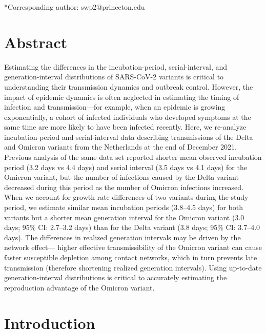 \documentclass[12pt]{article}
\begin{document}
\begin{flushleft}{
	\Large
	\textbf{}
}
*Corresponding author: swp2@princeton.edu
\bigskip

\section*{Abstract}

Estimating the differences in the incubation-period, serial-interval, and generation-interval distributions of SARS-CoV-2 variants is critical to understanding their transmission dynamics and outbreak control.
However, the impact of epidemic dynamics is often neglected in estimating the timing of infection and transmission---for example, when an epidemic is growing exponentially, a cohort of infected individuals who developed symptoms at the same time are more likely to have been infected recently.
Here, we re-analyze incubation-period and serial-interval data describing transmissions of the Delta and Omicron variants from the Netherlands at the end of December 2021.
Previous analysis of the same data set reported shorter mean observed incubation period (3.2 days vs 4.4 days) and serial interval (3.5 days vs 4.1 days) for the Omicron variant, but the number of infections caused by the Delta variant decreased during this period as the number of Omicron infections increased.
When we account for growth-rate differences of two variants during the study period, we estimate similar mean incubation periods (3.8--4.5 days) for both variants but a shorter mean generation interval for the Omicron variant (3.0 days; 95\% CI: 2.7--3.2 days) than for the Delta variant (3.8 days; 95\% CI: 3.7--4.0 days).
The differences in realized generation intervals may be driven by the network effect--- higher effective transmissibility of the Omicron variant can cause faster susceptible depletion among contact networks, which in turn prevents late transmission (therefore shortening realized generation intervals).
Using up-to-date generation-interval distributions is critical to accurately estimating the reproduction advantage of the Omicron variant.

\end{flushleft}

\pagebreak

\section{Introduction}
\end{document}

